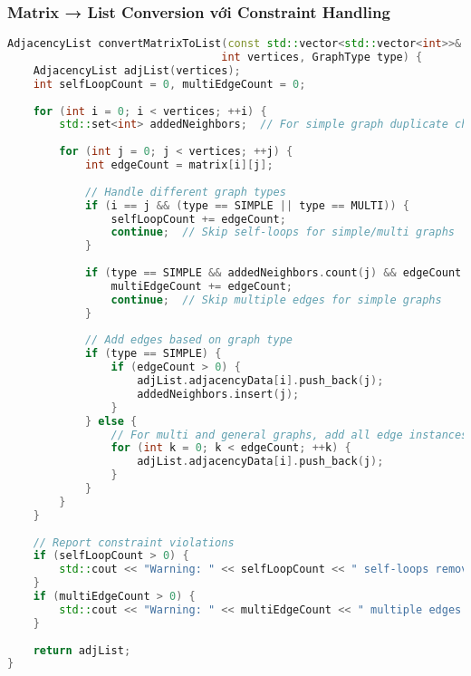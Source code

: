 \documentclass[12pt]{article}
\begin{document}
\subsubsection*{Matrix → List Conversion với Constraint Handling}
\begin{lstlisting}[language=C++, basicstyle=\ttfamily\footnotesize, frame=single]
AdjacencyList convertMatrixToList(const std::vector<std::vector<int>>& matrix, 
                                 int vertices, GraphType type) {
    AdjacencyList adjList(vertices);
    int selfLoopCount = 0, multiEdgeCount = 0;
    
    for (int i = 0; i < vertices; ++i) {
        std::set<int> addedNeighbors;  // For simple graph duplicate checking
        
        for (int j = 0; j < vertices; ++j) {
            int edgeCount = matrix[i][j];
            
            // Handle different graph types
            if (i == j && (type == SIMPLE || type == MULTI)) {
                selfLoopCount += edgeCount;
                continue;  // Skip self-loops for simple/multi graphs
            }
            
            if (type == SIMPLE && addedNeighbors.count(j) && edgeCount > 0) {
                multiEdgeCount += edgeCount;
                continue;  // Skip multiple edges for simple graphs
            }
            
            // Add edges based on graph type
            if (type == SIMPLE) {
                if (edgeCount > 0) {
                    adjList.adjacencyData[i].push_back(j);
                    addedNeighbors.insert(j);
                }
            } else {
                // For multi and general graphs, add all edge instances
                for (int k = 0; k < edgeCount; ++k) {
                    adjList.adjacencyData[i].push_back(j);
                }
            }
        }
    }
    
    // Report constraint violations
    if (selfLoopCount > 0) {
        std::cout << "Warning: " << selfLoopCount << " self-loops removed" << std::endl;
    }
    if (multiEdgeCount > 0) {
        std::cout << "Warning: " << multiEdgeCount << " multiple edges removed" << std::endl;
    }
    
    return adjList;
}
\end{lstlisting}
\end{document}

